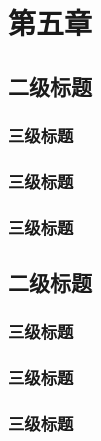 \chapter{第五章} \label{cht:nas}

\section{二级标题}

\subsection{三级标题}

\subsection{三级标题}

\subsection{三级标题}

\section{二级标题}

\subsection{三级标题}

\subsection{三级标题}

\subsection{三级标题}